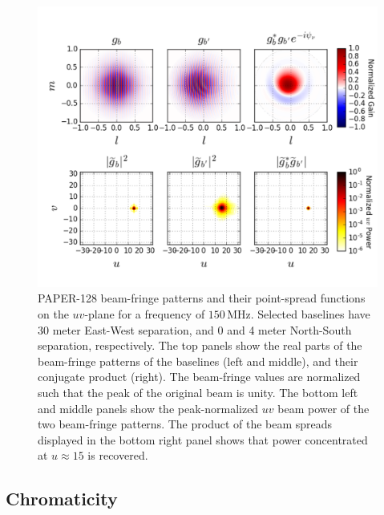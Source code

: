 \documentclass[twocolumn,apj,numberedappendix]{emulateapj}
\renewcommand\[{\begin{equation}}
\renewcommand\]{\end{equation}}
\begin{document}
\begin{figure}[h!]
\includegraphics[width=\textwidth]{BeamFringe}

\caption{PAPER-128 beam-fringe patterns and their point-spread functions on the $uv$-plane for a frequency of $150$\,MHz. Selected baselines have 30 meter East-West separation, and 0 and 4 meter North-South separation, respectively. The top panels show the real parts of the beam-fringe patterns of the baselines (left and middle), and their conjugate product (right). The beam-fringe values are normalized such that the peak of the original beam is unity. 
The bottom left and middle panels show the peak-normalized $uv$ beam power of the two beam-fringe patterns. The product of the beam spreads displayed in the bottom right panel shows that power concentrated at $u\approx15$ is recovered. }
\label{fig:beamfringe}
\end{figure}



\subsection{Chromaticity \label{sec:chromaticity}}
\end{document}
